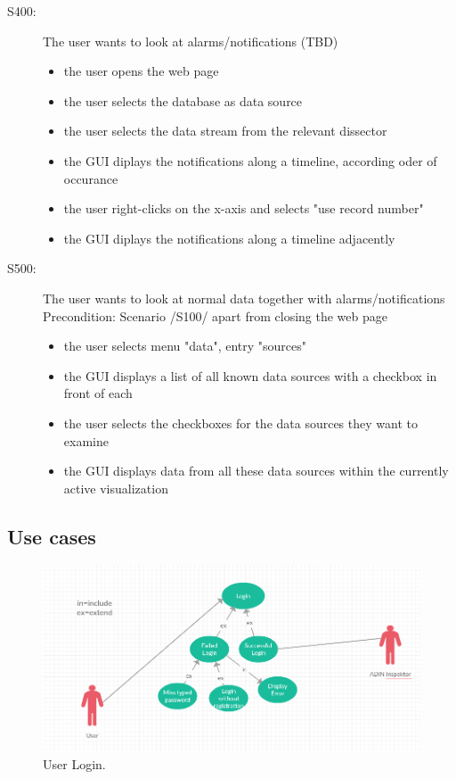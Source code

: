 \documentclass[twoside, english, draft]{Pflichtenheft}
\begin{document}
\begin{description}
	\item[S400:] The user wants to look at alarms/notifications (TBD)
	      \begin{itemize}
		      \item{the user opens the web page}
		      \item{the user selects the database as data source}
		      \item{the user selects the data stream from the relevant dissector}
		      \item{the GUI diplays the notifications along a timeline, according oder of occurance}
		      \item{the user right-clicks on the x-axis and selects "use record number"}
		      \item{the GUI diplays the notifications along a timeline adjacently}
	      \end{itemize}



	\item[S500:] The user wants to look at normal data together with alarms/notifications
	      \\
	      Precondition: Scenario /S100/ apart from closing the web page
	      \begin{itemize}
		      \item{the user selects menu "data", entry "sources"}
		      \item{the GUI displays a list of all known data sources with a checkbox in front of each}
		      \item{the user selects the checkboxes for the data sources they want to examine}
		      \item{the GUI displays data from all these data sources within the currently active visualization}
	      \end{itemize}


\end{description}

\subsection{Use cases}
\begin{figure}[h]
	\centering
	\includegraphics[width=\textwidth]{Images/login.PNG}
	\caption{User Login.}
\end{figure}
  
\end{document}
